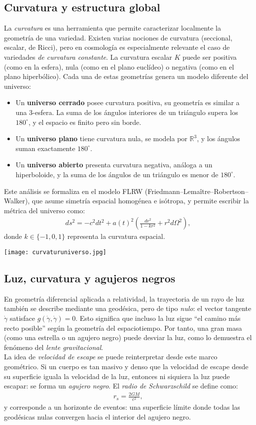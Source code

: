 \documentclass{aleph-revista}
\begin{document}
\subsection*{Curvatura y estructura global}
La \textit{curvatura} es una herramienta que permite caracterizar localmente la geometría de una variedad. Existen varias nociones de curvatura (seccional, escalar, de Ricci), pero en cosmología es especialmente relevante el caso de variedades \textit{de curvatura constante}. La curvatura escalar $K$ puede ser positiva (como en la esfera), nula (como en el plano euclídeo) o negativa (como en el plano hiperbólico). Cada una de estas geometrías genera un modelo diferente del universo:
\begin{itemize}
  \item Un \textbf{universo cerrado} posee curvatura positiva, su geometría es similar a una 3-esfera. La suma de los ángulos interiores de un triángulo supera los $180^\circ$, y el espacio es finito pero sin borde.
  \item Un \textbf{universo plano} tiene curvatura nula, se modela por $\mathbb{R}^3$, y los ángulos suman exactamente $180^\circ$.
  \item Un \textbf{universo abierto} presenta curvatura negativa, análoga a un hiperboloide, y la suma de los ángulos de un triángulo es menor de $180^\circ$.
\end{itemize}
Este análisis se formaliza en el modelo FLRW (Friedmann–Lemaître–Robertson–Walker), que asume simetría espacial homogénea e isótropa, y permite escribir la métrica del universo como:
\begin{align*}
  ds^2 = -c^2dt^2 + a(t)^2 \left( \frac{dr^2}{1 - kr^2} + r^2 d\Omega^2 \right),
\end{align*}
donde $k \in \{-1, 0, 1\}$ representa la curvatura espacial.
\begin{center}
  \texttt{[image: curvaturuniverso.jpg]}
\end{center}
\subsection*{Luz, curvatura y agujeros negros}
En geometría diferencial aplicada a relatividad, la trayectoria de un rayo de luz también se describe mediante una geodésica, pero de tipo \textit{nulo}: el vector tangente $\dot{\gamma}$ satisface $g(\dot{\gamma}, \dot{\gamma}) = 0$. Esto significa que incluso la luz sigue “el camino más recto posible” según la geometría del espaciotiempo. Por tanto, una gran masa (como una estrella o un agujero negro) puede desviar la luz, como lo demuestra el fenómeno del \textit{lente gravitacional}.\\
La idea de \textit{velocidad de escape} se puede reinterpretar desde este marco geométrico. Si un cuerpo es tan masivo y denso que la velocidad de escape desde su superficie iguala la velocidad de la luz, entonces ni siquiera la luz puede escapar: se forma un \textit{agujero negro}. El \textit{radio de Schwarzschild} se define como:
\begin{align*}
  r_s = \frac{2GM}{c^2}, 
\end{align*}
y corresponde a un horizonte de eventos: una superficie límite donde todas las geodésicas nulas convergen hacia el interior del agujero negro.
\end{document}

